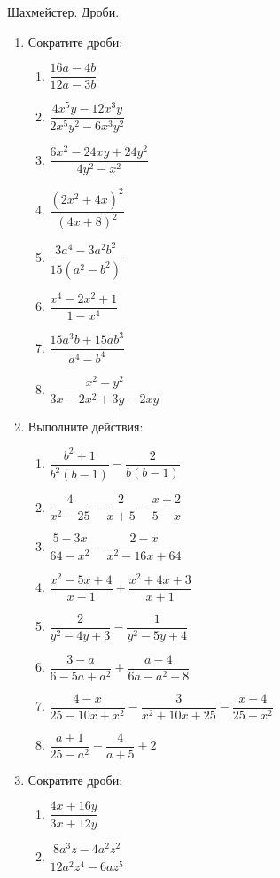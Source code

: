 \documentclass[12pt, a4paper]{article}
\begin{document}
	
	Шахмейстер. Дроби.
	\begin{enumerate}
		\item Сократите дроби:
		\begin{multicols}{2}
			\begin{enumerate}[label=\asbuk*)]
				\item \(\dfrac{16a-4b}{12a-3b}\)
				\item \(\dfrac{4x^5y-12x^3y}{2x^5y^2-6x^3y^2}\)
				\item \(\dfrac{6x^2-24xy+24y^2}{4y^2-x^2}\)
				\item \(\dfrac{(2x^2+4x)^2}{(4x+8)^2}\)
				\item \(\dfrac{3a^4-3a^2b^2}{15(a^2-b^2)}\)
				\item \(\dfrac{x^4-2x^2+1}{1-x^4}\)
				\item \(\dfrac{15a^3b+15ab^3}{a^4-b^4}\)
				\item \(\dfrac{x^2-y^2}{3x-2x^2+3y-2xy}\)
			\end{enumerate}
		\end{multicols}
		\item Выполните действия:
		\begin{multicols}{2}
			\begin{enumerate}[label=\asbuk*)]
				\item \(\dfrac{b^2+1}{b^2(b-1)}-\dfrac{2}{b(b-1)}\)
				\item \(\dfrac{4}{x^2-25}-\dfrac{2}{x+5}-\dfrac{x+2}{5-x}\)
				\item \(\dfrac{5-3x}{64-x^2}-\dfrac{2-x}{x^2-16x+64}\)
				\item \(\dfrac{x^2-5x+4}{x-1}+\dfrac{x^2+4x+3}{x+1}\)
				\item \(\dfrac{2}{y^2-4y+3}-\dfrac{1}{y^2-5y+4}\)
				\item \(\dfrac{3-a}{6-5a+a^2}+\dfrac{a-4}{6a-a^2-8}\)
				\item \(\dfrac{4-x}{25-10x+x^2}-\dfrac{3}{x^2+10x+25}-\dfrac{x+4}{25-x^2}\)
				\item \(\dfrac{a+1}{25-a^2}-\dfrac{4}{a+5}+2\)
			\end{enumerate}
		\end{multicols}
		\item Сократите дроби:
		\begin{multicols}{2}
			\begin{enumerate}[label=\asbuk*)]
				\item \(\dfrac{4x+16y}{3x+12y}\)
				\item \(\dfrac{8a^3z-4a^2z^2}{12a^2z^4-6az^5}\)

\end{enumerate}
\end{multicols}
\end{enumerate}
\end{document}
